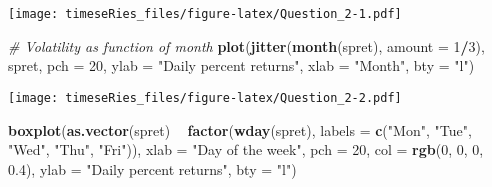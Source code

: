 \documentclass[]{book}
\newenvironment{Shaded}{\begin{snugshade}}{\end{snugshade}}
\newcommand{\CommentTok}[1]{\textcolor[rgb]{0.56,0.35,0.01}{\textit{#1}}}
\newcommand{\DataTypeTok}[1]{\textcolor[rgb]{0.13,0.29,0.53}{#1}}
\newcommand{\DecValTok}[1]{\textcolor[rgb]{0.00,0.00,0.81}{#1}}
\newcommand{\FloatTok}[1]{\textcolor[rgb]{0.00,0.00,0.81}{#1}}
\newcommand{\KeywordTok}[1]{\textcolor[rgb]{0.13,0.29,0.53}{\textbf{#1}}}
\newcommand{\NormalTok}[1]{#1}
\newcommand{\OperatorTok}[1]{\textcolor[rgb]{0.81,0.36,0.00}{\textbf{#1}}}
\newcommand{\StringTok}[1]{\textcolor[rgb]{0.31,0.60,0.02}{#1}}
\begin{document}
\begin{Shaded}
\end{Shaded}

\texttt{[image: timeseRies\_files/figure-latex/Question\_2-1.pdf]}

\begin{Shaded}
\begin{Highlighting}[]
\CommentTok{# Volatility as function of month}
\KeywordTok{plot}\NormalTok{(}\KeywordTok{jitter}\NormalTok{(}\KeywordTok{month}\NormalTok{(spret), }\DataTypeTok{amount =} \DecValTok{1}\OperatorTok{/}\DecValTok{3}\NormalTok{), spret, }\DataTypeTok{pch =} \DecValTok{20}\NormalTok{, }\DataTypeTok{ylab =} \StringTok{"Daily percent returns"}\NormalTok{, }
    \DataTypeTok{xlab =} \StringTok{"Month"}\NormalTok{, }\DataTypeTok{bty =} \StringTok{"l"}\NormalTok{)}
\end{Highlighting}
\end{Shaded}

\texttt{[image: timeseRies\_files/figure-latex/Question\_2-2.pdf]}

\begin{Shaded}
\begin{Highlighting}[]
\KeywordTok{boxplot}\NormalTok{(}\KeywordTok{as.vector}\NormalTok{(spret) }\OperatorTok{~}\StringTok{ }\KeywordTok{factor}\NormalTok{(}\KeywordTok{wday}\NormalTok{(spret), }\DataTypeTok{labels =} \KeywordTok{c}\NormalTok{(}\StringTok{"Mon"}\NormalTok{, }\StringTok{"Tue"}\NormalTok{, }\StringTok{"Wed"}\NormalTok{, }
    \StringTok{"Thu"}\NormalTok{, }\StringTok{"Fri"}\NormalTok{)), }\DataTypeTok{xlab =} \StringTok{"Day of the week"}\NormalTok{, }\DataTypeTok{pch =} \DecValTok{20}\NormalTok{, }\DataTypeTok{col =} \KeywordTok{rgb}\NormalTok{(}\DecValTok{0}\NormalTok{, }\DecValTok{0}\NormalTok{, }\DecValTok{0}\NormalTok{, }\FloatTok{0.4}\NormalTok{), }
    \DataTypeTok{ylab =} \StringTok{"Daily percent returns"}\NormalTok{, }\DataTypeTok{bty =} \StringTok{"l"}\NormalTok{)}
\end{Highlighting}
\end{Shaded}
\end{document}
